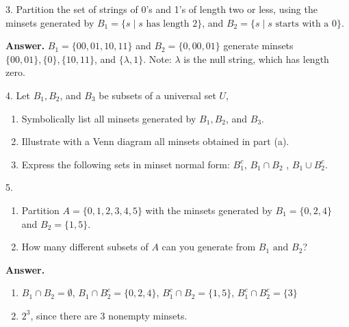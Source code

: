 \documentclass[10pt,]{book}
\theoremstyle{plain}
\theoremstyle{definition}
\theoremstyle{definition}
\theoremstyle{definition}
\begin{document}
\begin{exercisegroup}
\begin{enumerate}[label=\alph*]
\end{enumerate}
%
\par\smallskip
\item[3.]\hypertarget{exercise-14}{} Partition the set of strings of 0's and 1's of length two or less, using the minsets generated by \(B_1=\{s \mid s \textrm{ has length } 2\}\),
and \(B_2= \{s \mid s \textrm{ starts with a }   0\}\).%
\par\smallskip
\par\smallskip
\noindent\textbf{Answer.}\hypertarget{answer-7}{}\quad
 \(B_1= \{00, 01, 10, 11\}\) and \(B_2 = \{0, 00, 01\}\) generate minsets
 \(\{00, 01\}, \{0\}, \{10, 11\}\), and \(\{\lambda , 1\}\).
Note: \(\lambda\) is the null string, which has length zero.%
\item[4.]\hypertarget{exercise-minsets-3}{} Let \(B_1, B_2\), and \(B_3\) be subsets of a universal set \(U\),%
\par
\leavevmode%
\begin{enumerate}[label=\alph*]
\item\hypertarget{li-61}{}Symbolically list all minsets generated by \(B_1, B_2\), and \(B_3\).%
\item\hypertarget{li-62}{}Illustrate with a Venn diagram all minsets obtained in part (a).%
\item\hypertarget{li-63}{}Express the following sets in minset normal form: \(B_1^c\), \(B_1\cap B_2\) , \(B_1\cup B_2^c\).%
\end{enumerate}
%
\par\smallskip
\item[5.]\hypertarget{exercise-16}{}\leavevmode%
\begin{enumerate}[label=\alph*]
\item\hypertarget{li-64}{}Partition \(A = \{0, 1, 2, 3, 4, 5\}\) with the minsets generated by \(B_1= \{0, 2, 4\}\text{  }\)and \(B_2= \{1, 5\}\).%
\item\hypertarget{li-65}{}How many different subsets of \(A\) can you generate from  \(B_1 \textrm{ and } B_2\)?%
\end{enumerate}
%
\par\smallskip
\par\smallskip
\noindent\textbf{Answer.}\hypertarget{answer-8}{}\quad
\leavevmode%
\begin{enumerate}[label=\alph*]
\item\hypertarget{li-66}{} \(B_1\cap B_2=\emptyset\),  \(B_1\cap B_2^c=\{0,2,4\}\),
\(B_1^c\cap B_2=\{1,5\}\), \(B_1^c\cap B_2^c=\{3\}\)%
\item\hypertarget{li-67}{} \(2^3\), since there are 3 nonempty minsets.%
\end{enumerate}
%
\end{exercisegroup}
\end{document}
